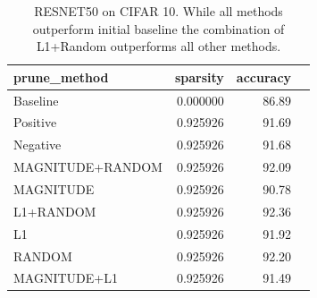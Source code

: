 \documentclass[runningheads]{llncs}
\begin{document}
\begin{table}[h]
\begin{tabular}{|l|r|r|r|}
\hline
     prune\_method &  sparsity &  accuracy \\ \hline
         Baseline &  0.000000 &     86.89 \\ \hline
         Positive &  0.925926 &     91.69 \\ \hline
         Negative &  0.925926 &     91.68 \\ \hline
 MAGNITUDE+RANDOM &  0.925926 &     92.09 \\ \hline
        MAGNITUDE &  0.925926 &     90.78 \\ \hline
        L1+RANDOM &  0.925926 &     92.36 \\ \hline
               L1 &  0.925926 &     91.92 \\ \hline
           RANDOM &  0.925926 &     92.20 \\ \hline
     MAGNITUDE+L1 &  0.925926  &     91.49 \\ \hline
\end{tabular}
\label{tab:cifar10-RESNET50}
\caption{RESNET50 on CIFAR 10. While all methods outperform initial baseline the combination of L1+Random outperforms all other methods.}
\end{table}
\end{document}
